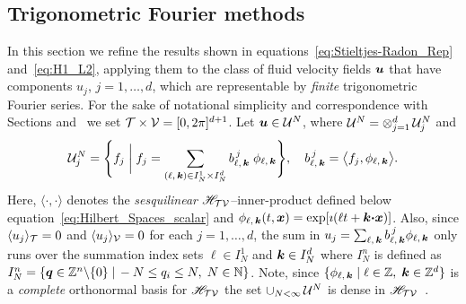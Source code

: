 \documentclass[amsa]{ipart}
\begin{document}
%
\subsection{Trigonometric Fourier methods}   
\label{sec:Trig:Fourier_Methods}
%
In this section we refine the results shown in
equations~\eqref{eq:Stieltjes-Radon_Rep} and~\eqref{eq:H1_L2},
applying them to the class of fluid velocity fields $\boldsymbol{u} $ that have
components $u_j$, $j=1,\ldots,d$, which are representable by 
\emph{finite} trigonometric Fourier series. For the sake of notational
simplicity and correspondence with Sections
 and~ we set
$\mathcal{T}\times\mathcal{V}=[0,2\pi]^{d+1}$. Let $\boldsymbol{u} \in\mathcal{U}^N$, where 
$\mathcal{U}^N=\otimes_{j=1}^d\,\mathcal{U}^N_j$ and  
%
\begin{align}\label{eq:velocity_field_space}
  \Uc^N_j=
  \Bigg\{f_j \;\bigg|\;
  f_j=\sum_{(\ell,\,\veck)\in I_N^1\times I_N^{d}}b^{\,j}_{\ell,\,\veck}\;\phi_{\ell,\,\veck}
  \Bigg\}, 
   \quad
  b^{\,j}_{\ell,\,\veck}=\big\langle f_j,\phi_{\ell,\,\veck}\big\rangle.
\end{align}
%
Here, $\langle\cdot,\cdot\rangle$ denotes the \emph{sesquilinear}
$\mathscr{H}_{\mathcal{T}\mathcal{V}}$--inner-product defined below
equation~\eqref{eq:Hilbert_Spaces_scalar} and
$\phi_{\ell,\,\boldsymbol{k}}(t,\boldsymbol{x})=\exp[\imath(\ell t+\boldsymbol{k}\mbox{\boldmath${\cdot}$}\boldsymbol{x})]$. Also, since
$\langle u_j\rangle_{\mathcal{T}}=0$ and $\langle u_j\rangle_{\mathcal{V}}=0$ for each $j=1,\ldots,d$, the sum in
$u_j=\sum_{\ell,\,\boldsymbol{k}}b^{\,j}_{\ell,\,\boldsymbol{k}}\phi_{\ell,\,\boldsymbol{k}}$ only runs over the summation
index sets $\ell\in I_N^1$ and $\boldsymbol{k}\in I_N^d$ where $I_N^n$ is defined as
$I_N^n=\{\boldsymbol{q}\in\mathbb{Z}^n\backslash\{0\}   \;|\, -N\leq q_i\leq N,
\;N\in\mathbb{N}\}$. Note, since $\{\phi_{\ell,\,\boldsymbol{k}} \;|\;
\ell\in\mathbb{Z},\;\boldsymbol{k}\in\mathbb{Z}^d\}$ is a \emph{complete} orthonormal
basis 
for $\mathscr{H}_{\mathcal{T}\mathcal{V}}$ the set $\cup_{N<\infty}\,\mathcal{U}^N$ is dense in
$\mathscr{H}_{\mathcal{T}\mathcal{V}}$~\cite{PapaRudin:87}.           
\end{document}
